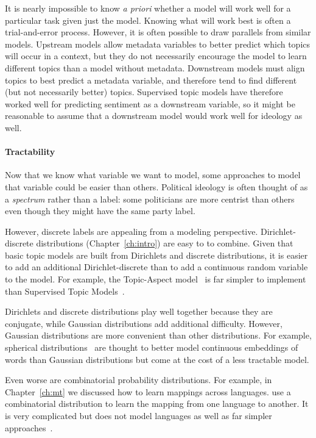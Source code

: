 It is nearly impossible to know \textit{a priori} whether a
model will work well for a particular task given just the model.
Knowing what will work best is often a trial-and-error
process.
However, it is often possible to draw parallels from similar models.
Upstream models allow metadata variables to better predict which topics
will occur in a context, but they do not necessarily encourage the model to 
learn different topics than a model without metadata.
Downstream models must align topics to best predict a metadata variable, 
and therefore tend to find different (but not necessarily better) topics.
Supervised topic models have therefore worked well for predicting sentiment as a downstream variable, so it might be reasonable to assume
that a downstream model would work well for ideology as well.

\paragraph{Tractability}

Now that we know what variable we want to model, some approaches to model that
variable could be easier than others.  Political ideology is often
thought of as a \emph{spectrum} rather than a label: some politicians
are more centrist than others even though they might have the same
party label.

However, discrete labels are appealing from a modeling perspective.
Dirichlet-discrete distributions (Chapter~\ref{ch:intro})
are easy to to combine.  Given that basic topic models are built from
Dirichlets and discrete distributions, it is easier to add an additional
Dirichlet-discrete than to add a continuous random variable to the
model.  For example, the Topic-Aspect model~\citep{paul-10} is far simpler to
implement than Supervised Topic Models~\citep{blei-07b}.

Dirichlets and discrete distributions play well together because they are
conjugate, while Gaussian distributions add additional
difficulty.  However, Gaussian distributions are more convenient than
other distributions.  For example, spherical distributions~\citep{Batmanghelich-16} are thought
to better model continuous embeddings of words than Gaussian
distributions but come at the cost of a less tractable model.

Even worse are combinatorial probability distributions.  For example,
in Chapter~\ref{ch:mt} we discussed how to learn mappings across
languages.  \citet{boyd-graber-09} use a combinatorial distribution to learn the
mapping from one language to another.  It is very complicated but
does not model languages as well as far simpler approaches~\citep{mimno-09}.

